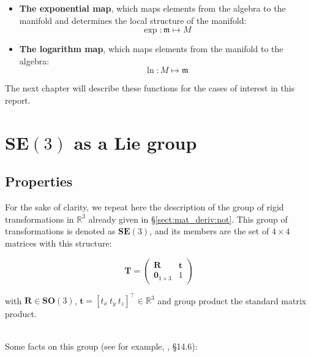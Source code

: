\documentclass[a4paper,11pt]{report}
\begin{document}
\begin{itemize}
\item{\textbf{The exponential map}, which maps elements from 
the algebra to the manifold and determines the local structure 
of the manifold:
\begin{equation}
 \exp: \mathfrak{m}  \mapsto M
\end{equation}
}
\item{\textbf{The logarithm map}, which maps elements from 
the manifold to the algebra:
\begin{equation}
 \ln: M  \mapsto \mathfrak{m}
\end{equation}
}
\end{itemize}

The next chapter will describe these functions for 
the cases of interest in this report.



\chapter{$\mathbf{SE}(3)$ as a Lie group}
\label{chap:se3_lie}

\section{Properties}

For the sake of clarity, we repeat here the description of 
the group of rigid transformations in $\mathbb{R}^3$ already given 
in \S\ref{sect:mat_deriv:not}.
This group of transformations is denoted as $\mathbf{SE}(3)$, 
and its members are the set of $4 \times 4$ matrices with this structure:

\begin{equation}
\label{eq:T_Rt_bis}
 \mathbf{T} = 
\left(
\begin{array}{c|c}
  \mathbf{R} & \mathbf{t} \\
\hline
  \mathbf{0}_{1\times 3} & 1
\end{array}
\right)
\end{equation}

\noindent with $\mathbf{R} \in \mathbf{SO}(3)$, 
$\mathbf{t}=[t_x ~ t_y ~ t_z]^\top \in \mathbb{R}^3$
and group product the standard matrix product.

~\\

Some facts on this group (see for example, \cite{gallier2001geometric}, \S14.6):
\end{document}
